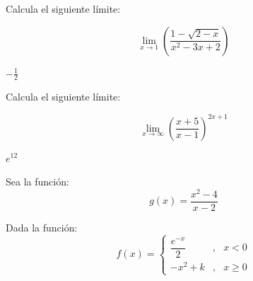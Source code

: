 \documentclass[addpoints,spanish, 12pt,a4paper]{exam}
\begin{document}
\begin{questions}

%
%
%

\question[1] Calcula el siguiente límite:

$$\lim_{x \to 1}\left(\frac{1 - \sqrt{2 - x}}{x^{2} - 3 x + 2}\right)$$

\begin{solution}$- \frac{1}{2}$\end{solution}

\question[1] Calcula el siguiente límite:

$$\lim_{x \to \infty} \left(\frac{x + 5}{x - 1}\right)^{2 x + 1}$$

\begin{solution}$e^{12}$\end{solution}

\question Sea la función: $$g(x)=\dfrac{x^2-4}{x-2}$$

\question Dada la función:
$$f(x)=\left\{ \begin{array}{ccl} \dfrac{e^{-x}}{2} & , & x < 0 \\ -x^2+k & , & x\geqslant 0 \end{array} \right.$$
\begin{parts}

\end{parts}
\end{questions}
\end{document}
